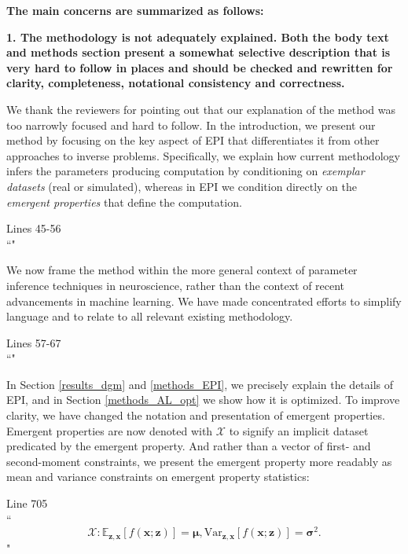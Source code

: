 \documentclass[11pt,a4paper]{article}
\begin{document}
\textbf{The main concerns are summarized as follows:}

\textbf{1. The methodology is not adequately explained. Both the body text and methods section present a somewhat selective description that is very hard to follow in places and should be checked and rewritten for clarity, completeness, notational consistency and correctness.}

We thank the reviewers for pointing out that our explanation of the method was too narrowly focused and hard to follow. 
In the introduction, we present our method by focusing on the key aspect of EPI that differentiates it from other approaches to inverse problems.
Specifically, we explain how current methodology infers the parameters producing computation by conditioning on \textit{exemplar datasets} (real or simulated), whereas in EPI we condition directly on the \textit{emergent properties} that define the computation.

\begin{displayquote}
Lines 45-56\\
``"
\end{displayquote}

We now frame the method within the more general context of parameter inference techniques in neuroscience, rather than the context of recent advancements in machine learning.
We have made concentrated efforts to simplify language and to relate to all relevant existing methodology.

\begin{displayquote}
Lines 57-67\\
``"
\end{displayquote}

In Section \ref{results_dgm} and \ref{methods_EPI}, we precisely explain the details of EPI, and in Section \ref{methods_AL_opt} we show how it is optimized.
To improve clarity, we have changed the notation and presentation of emergent properties.
Emergent properties are now denoted with $\mathcal{X}$ to signify an implicit dataset predicated by the emergent property.
And rather than a vector of first- and second-moment constraints, we present the emergent property more readably as mean and variance constraints on emergent property statistics:

\begin{displayquote}
Line 705 \\
``
\begin{equation} \tag{11}
\mathcal{X}: \mathbb{E}_{\mathbf{z},\mathbf{x}}\left[f(\mathbf{x}; \mathbf{z})\right] = \bm{\mu}, \text{Var}_{\mathbf{z},\mathbf{x}}\left[f(\mathbf{x}; \mathbf{z})\right] = \bm{\sigma}^2.
\end{equation}"
\end{displayquote}
\end{document}
